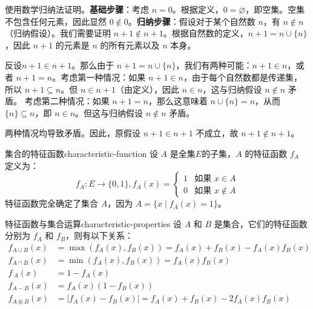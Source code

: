 使用数学归纳法证明。\textbf{基础步骤}：考虑 $n = 0$。根据定义，$0 = \varnothing$，即空集。空集不包含任何元素，因此显然 $0 \notin 0$。\textbf{归纳步骤}：假设对于某个自然数 $n$，有 $n \notin n$（归纳假设）。我们需要证明 $n+1 \notin n+1$。根据自然数的定义，$n+1 = n \cup \{n\}$，因此 $n+1$ 的元素是 $n$ 的所有元素以及 $n$ 本身。

反设$n+1 \in n+1$。那么由于 $n+1 = n \cup \{n\}$，我们有两种可能：$n+1 \in n$，或者 $n+1 = n$。考虑第一种情况：如果 $n+1 \in n$，由于每个自然数都是传递集，所以 $n+1 \subseteq n$。但 $n \in n+1$（由定义），因此 $n \in n$，这与归纳假设 $n \notin n$ 矛盾。
考虑第二种情况：如果 $n+1 = n$，那么这意味着 $n \cup \{n\} = n$，从而 $\{n\} \subseteq n$，即 $n \in n$。但这与归纳假设 $n \notin n$ 矛盾。

两种情况均导致矛盾。因此，原假设 $n+1 \in n+1$ 不成立，故 $n+1 \notin n+1$。
\begin{definition}{集合的特征函数}{characteristic-function}
设 $A$ 是全集$E$的子集，$A$ 的特征函数 $f_A$ 定义为：
\[
f_A:E\to\{0,1\},f_A(x) = 
\begin{cases}
1 & \text{如果 } x \in A \\
0 & \text{如果 } x \notin A
\end{cases}
\]
特征函数完全确定了集合 $A$，因为 $A = \{x \mid f_A(x) = 1\}$。
\end{definition}
\begin{theorem}{特征函数与集合运算}{characteristic-properties}
设 $A$ 和 $B$ 是集合，它们的特征函数分别为 $f_A$ 和 $f_B$，则有以下关系：\vspace{-5pt}
\begin{align*}
f_{A \cup B}(x) &= \max(f_A(x), f_B(x)) = f_A(x) + f_B(x) - f_A(x)f_B(x) \\
f_{A \cap B}(x) &= \min(f_A(x), f_B(x)) = f_A(x)f_B(x) \\
f_{~A}(x) &= 1 - f_A(x) \\
f_{A -B}(x) &= f_A(x)(1 - f_B(x)) \\
f_{A \oplus B}(x) &= |f_A(x) - f_B(x)| = f_A(x) + f_B(x) - 2f_A(x)f_B(x)
\end{align*}
\end{theorem}

